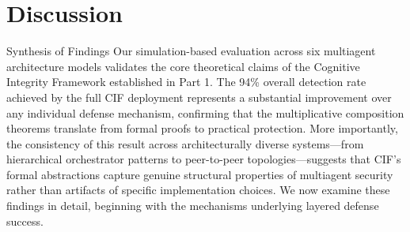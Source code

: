 \documentclass[
  ignorenonframetext,
]{beamer}
\author{\texorpdfstring{}{}}
\date{}
\begin{document}
\begin{frame}
\newpage
\end{frame}

\section{Discussion}\label{sec:discussion}

\begin{frame}{Synthesis of Findings}
\protect{}\label{synthesis-of-findings}
Our simulation-based evaluation across six multiagent architecture
models validates the core theoretical claims of the Cognitive Integrity
Framework established in Part 1. The 94\% overall detection rate
achieved by the full CIF deployment represents a substantial improvement
over any individual defense mechanism, confirming that the
multiplicative composition theorems translate from formal proofs to
practical protection. More importantly, the consistency of this result
across architecturally diverse systems---from hierarchical orchestrator
patterns to peer-to-peer topologies---suggests that CIF's formal
abstractions capture genuine structural properties of multiagent
security rather than artifacts of specific implementation choices. We
now examine these findings in detail, beginning with the mechanisms
underlying layered defense success.


\end{frame}
\end{document}
